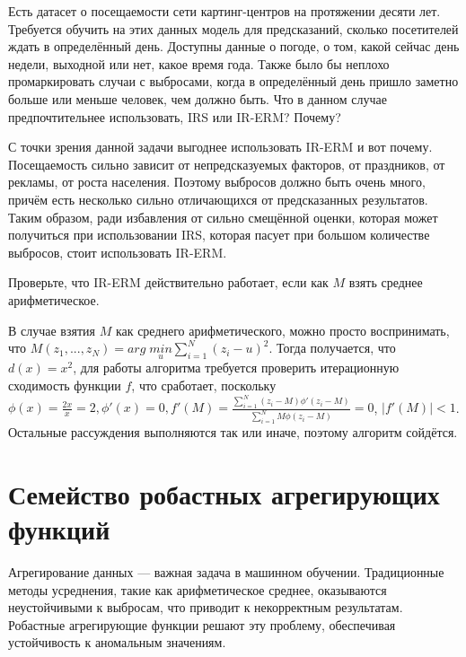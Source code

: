 \problem

Есть датасет о посещаемости сети картинг-центров на протяжении десяти лет. Требуется обучить на этих данных модель для предсказаний, сколько посетителей ждать в определённый день. Доступны данные о погоде, о том, какой сейчас день недели, выходной или нет, какое время года. Также было бы неплохо промаркировать случаи с выбросами, когда в определённый день пришло заметно больше или меньше человек, чем должно быть. Что в данном случае предпочтительнее использовать, IRS или IR-ERM? Почему?


\begin{solution}

    С точки зрения данной задачи выгоднее использовать IR-ERM и вот почему. Посещаемость сильно зависит от непредсказуемых факторов, от праздников, от рекламы, от роста населения. Поэтому выбросов должно быть очень много, причём есть несколько сильно отличающихся от предсказанных результатов. Таким образом, ради избавления от сильно смещённой оценки, которая может получиться при использовании IRS, которая пасует при большом количестве выбросов, стоит использовать IR-ERM.

\end{solution}


\problem

Проверьте, что IR-ERM действительно работает, если как $M$ взять среднее арифметическое.

\begin{solution}
    В случае взятия $M$ как среднего арифметического, можно просто воспринимать, что $M(z_1,...,z_N) = arg \; \underset{u}{min} \sum_{i=1}^N (z_i - u)^2$. Тогда получается, что $d(x) = x^2$, для работы алгоритма требуется проверить итерационную сходимость функции $f$, что сработает, поскольку $\phi (x) = \frac{2x}{x} = 2, \phi'(x) = 0, f'(M) = \frac{\sum_{i=1}^N (z_i - M) \phi'(z_i - M)}{\sum_{i=1}^N M \phi(z_i - M)} = 0$,
    $|f'(M)| < 1$. Остальные рассуждения выполняются так или иначе, поэтому алгоритм сойдётся.
\end{solution}

\section*{Семейство робастных агрегирующих функций}
Агрегирование данных — важная задача в машинном обучении. Традиционные методы усреднения, такие как арифметическое среднее, оказываются неустойчивыми к выбросам, что приводит к некорректным результатам. Робастные агрегирующие функции решают эту проблему, обеспечивая устойчивость к аномальным значениям.

